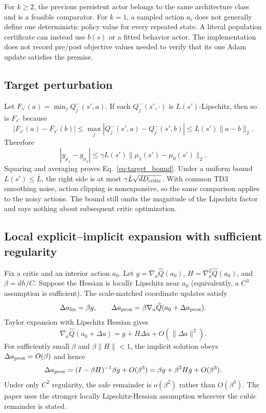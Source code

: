 \documentclass[letterpaper]{article}
\begin{document}
For $k\ge2$, the previous persistent actor belongs to the same architecture class and is a feasible comparator. For $k=1$, a sampled action $a_i$ does not generally define one deterministic policy value for every repeated state. A literal population certificate can instead use $b(s)$ or a fitted behavior actor. The implementation does not record pre/post objective values needed to verify that its one Adam update satisfies the premise.

\subsection{Target perturbation}
Let $F_{s'}(a)=\min_jQ_j^-(s',a)$. If each $Q_j^-(s',\cdot)$ is $L(s')$-Lipschitz, then so is $F_{s'}$ because
\begin{equation}
|F_{s'}(a)-F_{s'}(b)|\leq\max_j|Q_j^-(s',a)-Q_j^-(s',b)|\leq L(s')\|a-b\|_2.
\end{equation}
Therefore
\begin{equation}
|y_{\mu_1}-y_{\mu_0}|\leq\gamma L(s')\|\mu_1(s')-\mu_0(s')\|_2.
\end{equation}
Squaring and averaging proves Eq.~\eqref{eq:target_bound}. Under a uniform bound $L(s')\leq\bar L$, the right side is at most $\gamma\bar L\sqrt{dD_{\rm critic}}$. With common TD3 smoothing noise, action clipping is nonexpansive, so the same comparison applies to the noisy actions. The bound still omits the magnitude of the Lipschitz factor and says nothing about subsequent critic optimization.

\subsection{Local explicit--implicit expansion with sufficient regularity}
Fix a critic and an interior action $a_0$. Let $g=\nabla_a\widehat Q(a_0)$, $H=\nabla_a^2\widehat Q(a_0)$, and $\beta=dh/C$. Suppose the Hessian is locally Lipschitz near $a_0$ (equivalently, a $C^3$ assumption is sufficient). The scale-matched coordinate updates satisfy
\begin{equation}
\Delta a_{\rm lin}=\beta g,
\qquad
\Delta a_{\rm prox}=\beta\nabla_a\widehat Q(a_0+\Delta a_{\rm prox}).
\end{equation}
Taylor expansion with Lipschitz Hessian gives
\begin{equation}
\nabla_a\widehat Q(a_0+\Delta a)=g+H\Delta a+O(\|\Delta a\|^2).
\end{equation}
For sufficiently small $\beta$ and $\beta\|H\|<1$, the implicit solution obeys $\Delta a_{\rm prox}=O(\beta)$ and hence
\begin{equation}
\Delta a_{\rm prox}=(I-\beta H)^{-1}\beta g+O(\beta^3)
=\beta g+\beta^2Hg+O(\beta^3).
\end{equation}
Under only $C^2$ regularity, the safe remainder is $o(\beta^2)$ rather than $O(\beta^3)$. The paper uses the stronger locally Lipschitz-Hessian assumption wherever the cubic remainder is stated.
\end{document}
